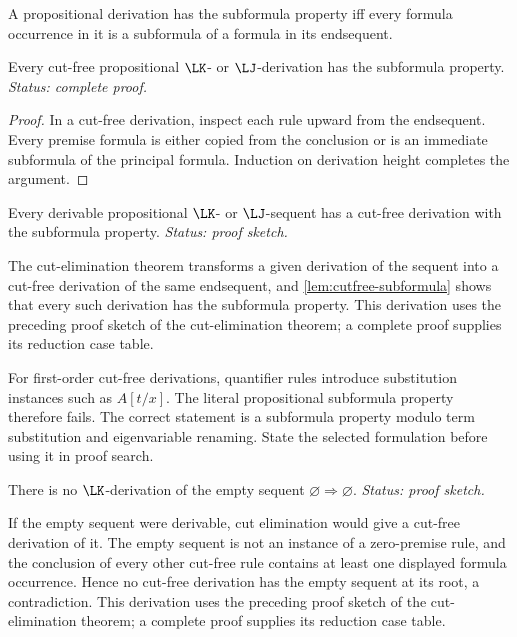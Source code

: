 \begin{definition}
A propositional derivation has the subformula property iff every
formula occurrence in it is a subformula of a formula in its endsequent.
\end{definition}

\begin{lemma}
\label{lem:cutfree-subformula}
Every cut-free propositional \(\LK\)- or \(\LJ\)-derivation has the
subformula property.
\textit{Status: complete proof.}
\end{lemma}

\begin{proof}
In a cut-free derivation, inspect each rule upward from the endsequent.  Every
premise formula is either copied from the conclusion or is an immediate
subformula of the principal formula.  Induction on derivation height completes
the argument.
\end{proof}

\begin{corollary}
Every derivable propositional \(\LK\)- or \(\LJ\)-sequent has a cut-free
derivation with the subformula property.
\textit{Status: proof sketch.}
\end{corollary}

\begin{proofplan}
The cut-elimination theorem transforms a given derivation of the sequent
into a cut-free derivation of the same endsequent, and
\cref{lem:cutfree-subformula} shows that every such derivation has the
subformula property.
This derivation uses the preceding proof sketch of the cut-elimination
theorem; a complete proof supplies its reduction case table.
\end{proofplan}

\begin{remark}
For first-order cut-free derivations, quantifier rules introduce substitution
instances such as \(A[t/x]\).  The literal propositional subformula property
therefore fails.  The correct statement is a subformula property modulo term
substitution and eigenvariable renaming.  State the selected formulation
before using it in proof search.
\end{remark}

\begin{corollary}
There is no \(\LK\)-derivation of the empty sequent
\(\varnothing\Rightarrow\varnothing\).
\textit{Status: proof sketch.}
\end{corollary}

\begin{proofplan}
If the empty sequent were derivable, cut elimination would give a cut-free
derivation of it.  The empty sequent is not an instance of a zero-premise
rule, and the conclusion of every other cut-free rule contains at least one
displayed formula occurrence.  Hence no cut-free derivation has the empty
sequent at its root, a contradiction.
This derivation uses the preceding proof sketch of the cut-elimination
theorem; a complete proof supplies its reduction case table.
\end{proofplan}


